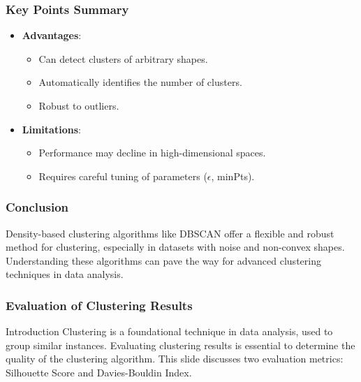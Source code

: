 \documentclass{beamer}
\begin{document}
\begin{frame}[fragile]
    \frametitle{Key Points Summary}
    \begin{itemize}
        \item \textbf{Advantages}:
            \begin{itemize}
                \item Can detect clusters of arbitrary shapes.
                \item Automatically identifies the number of clusters.
                \item Robust to outliers.
            \end{itemize}
        \item \textbf{Limitations}:
            \begin{itemize}
                \item Performance may decline in high-dimensional spaces.
                \item Requires careful tuning of parameters ($\epsilon$, minPts).
            \end{itemize}
    \end{itemize}
\end{frame}

\begin{frame}[fragile]
    \frametitle{Conclusion}
    Density-based clustering algorithms like DBSCAN offer a flexible and robust method for clustering, especially in datasets with noise and non-convex shapes. Understanding these algorithms can pave the way for advanced clustering techniques in data analysis.
\end{frame}

\begin{frame}[fragile]
    \frametitle{Evaluation of Clustering Results}
    \begin{block}{Introduction}
        Clustering is a foundational technique in data analysis, used to group similar instances. 
        Evaluating clustering results is essential to determine the quality of the clustering algorithm. 
        This slide discusses two evaluation metrics: Silhouette Score and Davies-Bouldin Index.
    \end{block}
\end{frame}
\end{document}

